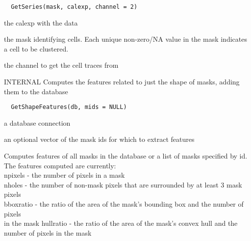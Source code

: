 \documentclass[a4paper]{book}
\begin{document}
%
\begin{Usage}
\begin{verbatim}
  GetSeries(mask, calexp, channel = 2)
\end{verbatim}
\end{Usage}
%
\begin{Arguments}
\begin{ldescription}
\item[\code{calexp}] the calexp with the data

\item[\code{mask}] the mask identifying cells.  Each unique
non-zero/NA value in the mask indicates a cell to be
clustered.

\item[\code{channel}] the channel to get the cell traces from
\end{ldescription}
\end{Arguments}
%
\begin{Description}\relax
INTERNAL Computes the features related to just the shape
of masks, adding them to the database
\end{Description}
%
\begin{Usage}
\begin{verbatim}
  GetShapeFeatures(db, mids = NULL)
\end{verbatim}
\end{Usage}
%
\begin{Arguments}
\begin{ldescription}
\item[\code{db}] a database connection

\item[\code{mids}] an optional vector of the mask ids for which
to extract features
\end{ldescription}
\end{Arguments}
%
\begin{Details}\relax
Computes features of all masks in the database or a list
of masks specified by id.  The features computed are
currently:\\{} npixels - the number of pixels in a mask
\\{} nholes - the number of non-mask pixels that are
surrounded by at least 3 mask pixels\\{} bboxratio - the
ratio of the area of the mask's bounding box and the
number of pixels\\{} in the mask hullratio - the ratio of
the area of the mask's convex hull and the number of
pixels in the mask\\{}
\end{Details}
\end{document}
